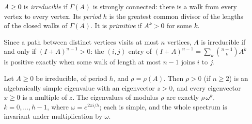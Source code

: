 \begin{definition}\label{linear:def:irreducible}
$A\ge0$ is \emph{irreducible} if $\Gamma(A)$ is strongly connected: there is a walk from every vertex to every vertex. Its
\emph{period} $h$ is the greatest common divisor of the lengths of the closed walks of $\Gamma(A)$. It is \emph{primitive} if
$A^k>0$ for some $k$.
\end{definition}

Since a path between distinct vertices visits at most $n$ vertices, $A$ is irreducible if and only if $(I+A)^{n-1}>0$: the
$(i,j)$ entry of $(I+A)^{n-1}=\sum_k\binom{n-1}kA^k$ is positive exactly when some walk of length at most $n-1$ joins $i$ to $j$.

\begin{theorem}[Frobenius, 1912]\label{linear:thm:frobenius}
Let $A\ge0$ be irreducible, of period $h$, and $\rho=\rho(A)$. Then $\rho>0$ (if $n\ge2$) is an algebraically simple
eigenvalue with an eigenvector $z>0$, and every eigenvector $x\ge0$ is a multiple of $z$. The eigenvalues of modulus $\rho$ are
exactly $\rho\,\omega^k$, $k=0,\dots,h-1$, where $\omega=e^{2\pi i/h}$; each is simple, and the whole spectrum is invariant under
multiplication by $\omega$.
\end{theorem}
